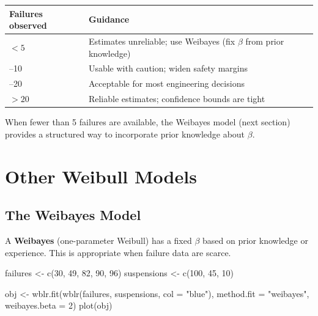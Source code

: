 \documentclass[
  letterpaper,
  DIV=11,
  numbers=noendperiod]{scrreprt}
\newenvironment{Shaded}{\begin{snugshade}}{\end{snugshade}}
\newcommand{\AttributeTok}[1]{\textcolor[rgb]{0.40,0.45,0.13}{#1}}
\newcommand{\DecValTok}[1]{\textcolor[rgb]{0.68,0.00,0.00}{#1}}
\newcommand{\FunctionTok}[1]{\textcolor[rgb]{0.28,0.35,0.67}{#1}}
\newcommand{\NormalTok}[1]{\textcolor[rgb]{0.00,0.23,0.31}{#1}}
\newcommand{\OtherTok}[1]{\textcolor[rgb]{0.00,0.23,0.31}{#1}}
\newcommand{\StringTok}[1]{\textcolor[rgb]{0.13,0.47,0.30}{#1}}
\newcounter{none} %
\begin{document}
{\def\LTcaptype{none} %
\begin{longtable}[]{@{}
  >{\raggedright\arraybackslash}p{}
  >{\raggedright\arraybackslash}p{}@{}}
\toprule\noalign{}
\begin{minipage}[b]{\linewidth}\raggedright
Failures observed
\end{minipage} & \begin{minipage}[b]{\linewidth}\raggedright
Guidance
\end{minipage} \\
\midrule\noalign{}
\endhead
\bottomrule\noalign{}
\endlastfoot
\(< 5\) & Estimates unreliable; use Weibayes (fix \(\beta\) from prior
knowledge) \\
5--10 & Usable with caution; widen safety margins \\
10--20 & Acceptable for most engineering decisions \\
\(> 20\) & Reliable estimates; confidence bounds are tight \\
\end{longtable}
}

When fewer than 5 failures are available, the Weibayes model (next
section) provides a structured way to incorporate prior knowledge about
\(\beta\).

\section{Other Weibull Models}\label{other-weibull-models}

\subsection{The Weibayes Model}\label{the-weibayes-model}

A \textbf{Weibayes} (one-parameter Weibull) has a fixed \(\beta\) based
on prior knowledge or experience. This is appropriate when failure data
are scarce.

\begin{Shaded}
\begin{Highlighting}[]
\NormalTok{failures    }\OtherTok{\textless{}{-}} \FunctionTok{c}\NormalTok{(}\DecValTok{30}\NormalTok{, }\DecValTok{49}\NormalTok{, }\DecValTok{82}\NormalTok{, }\DecValTok{90}\NormalTok{, }\DecValTok{96}\NormalTok{)}
\NormalTok{suspensions }\OtherTok{\textless{}{-}} \FunctionTok{c}\NormalTok{(}\DecValTok{100}\NormalTok{, }\DecValTok{45}\NormalTok{, }\DecValTok{10}\NormalTok{)}

\NormalTok{obj }\OtherTok{\textless{}{-}} \FunctionTok{wblr.fit}\NormalTok{(}\FunctionTok{wblr}\NormalTok{(failures, suspensions, }\AttributeTok{col =} \StringTok{"blue"}\NormalTok{),}
                \AttributeTok{method.fit =} \StringTok{"weibayes"}\NormalTok{, }\AttributeTok{weibayes.beta =} \DecValTok{2}\NormalTok{)}
\FunctionTok{plot}\NormalTok{(obj)}
\end{Highlighting}
\end{Shaded}
\end{document}
